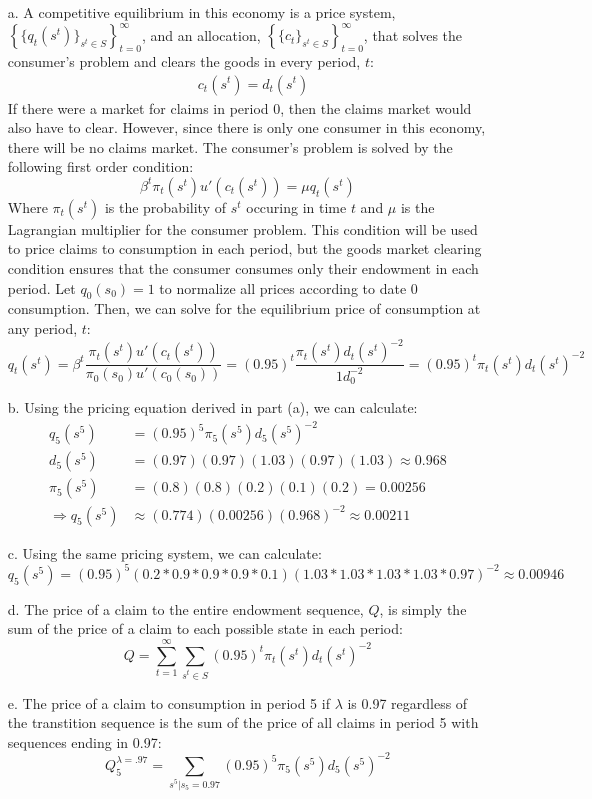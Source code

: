 \documentclass{article}
\begin{document}
\begin{itemize}
	\item[a.] A competitive equilibrium in this economy is a price system, ${\left\{\{q_t(s^t)\}_{s^t\in S}\right\}_{t=0}^\infty}$, and an allocation, ${\left\{\{c_t\}_{s^t\in S}\right\}_{t=0}^\infty}$, that solves the consumer's problem and clears the goods in every period, $t$:
		\begin{align*} &c_t(s^t) = d_t(s^t)  \end{align*}
		If there were a market for claims in period 0, then the claims market would also have to clear. However, since there is only one consumer in this economy, there will be no claims market. The consumer's problem is solved by the following first order condition:
		\[
			\beta^t\pi_t(s^t)u'(c_t(s^t)) = \mu q_t(s^t)
		\]
		Where $\pi_t(s^t)$ is the probability of $s^t$ occuring in time $t$ and $\mu$ is the Lagrangian multiplier for the consumer problem. This condition will be used to price claims to consumption in each period, but the goods market clearing condition ensures that the consumer consumes only their endowment in each period. Let ${q_0(s_0)=1}$ to normalize all prices according to date 0 consumption. Then, we can solve for the equilibrium price of consumption at any period, $t$:
		\[
			q_t(s^t) = \beta^t\frac{\pi_t(s^t)u'(c_t(s^t))}{\pi_0(s_0)u'(c_0(s_0))} = (0.95)^t\frac{\pi_t(s^t)d_t(s^t)^{-2}}{1d_0^{-2}} = (0.95)^t\pi_t(s^t)d_t(s^t)^{-2}
		\]
	
	\item[b.] Using the pricing equation derived in part (a), we can calculate:
		\begin{align*}
						q_5(s^5)	&= (0.95)^5\pi_5(s^5)d_5(s^5)^{-2}						\\
						d_5(s^5)	&= (0.97)(0.97)(1.03)(0.97)(1.03) \approx 0.968			\\
						\pi_5(s^5)	&= (0.8)(0.8)(0.2)(0.1)(0.2) = 0.00256					\\
			\Rightarrow q_5(s^5)	&\approx (0.774)(0.00256)(0.968)^{-2} \approx 0.00211
		\end{align*}
	
	\item[c.] Using the same pricing system, we can calculate:
		\[
			q_5(s^5) = (0.95)^5\left(0.2*0.9*0.9*0.9*0.1\right)\left(1.03*1.03*1.03*1.03*0.97\right)^{-2} \approx 0.00946
		\]
	
	\item[d.] The price of a claim to the entire endowment sequence, $Q$, is simply the sum of the price of a claim to each possible state in each period:
		\[
			Q = \sum_{t=1}^\infty \sum_{s^t\in S} (0.95)^t\pi_t(s^t)d_t(s^t)^{-2}
		\]
	
	\item[e.] The price of a claim to consumption in period 5 if $\lambda$ is 0.97 regardless of the transtition sequence is the sum of the price of all claims in period 5 with sequences ending in 0.97:
		\[
			Q_5^{\lambda = .97} = \sum_{s^5|s_5=0.97}(0.95)^5\pi_5(s^5)d_5(s^5)^{-2}
		\]
	
\end{itemize}
\end{document}
